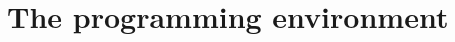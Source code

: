 \documentclass[10pt]{scrartcl}
\begin{document}
\section{The programming environment}
\label{sec:programmingenvironment}

\begin{comment}
\subsection{Playchess}
\label{sec:playchess}

We will be using a simple program called {\ttfamily playchess} which does
the following (also see figure~\ref{fig:chain2}):

\begin{enumerate}
\addtolength{\itemsep}{-.1cm}
\item Call an existing chess program (GnuChess) or your endgame solver
      to play a white move.
\item Call the Java path planning module with white move.
\item Execute the Java inverse kinematics module to convert the
      Cartesian positions into values of the joint angles of the robot arm.
\item Send the joint angles to a simulator ({\ttfamily umirtxsimulator}) for
      inspection, and send them to the real robot.
\item Ask the user for a black move.
\end{enumerate}
\begin{figure}%
  \centerline{\epsfig{figure=images/chain2.eps,width = 0.75\textwidth}}
  \caption{Information flow of the different components controlled by the
  {\ttfamily playchess} program. The gray-filled components are only partly
  provided and should be completed during the course. {\ttfamily board.gch}
  and {\tt *.txt} denote actual files which can be inspected and
  manipulated.}
  \label{fig:chain2}
\end{figure}
The derived programs {\ttfamily endgamerook} and {\ttfamily endgamequeen} call the
Prolog endgame solver for white moves while the user (you, or gnuchess if you
choose to) provides the black moves. This way you can test the endgame solver.
Basic path planning and inverse kinematics modules are already
provided for testing. However, during the practical course you will
develop your own modules which are hopefully as good as or better than
the ones provided. In the {\ttfamily playchess}, {\ttfamily endgamerook} and {\ttfamily
endgamequeen} programs you can decide which modules to use, the ones
provided or the ones you developed, by changing the settings.


\end{comment}
\end{document}
